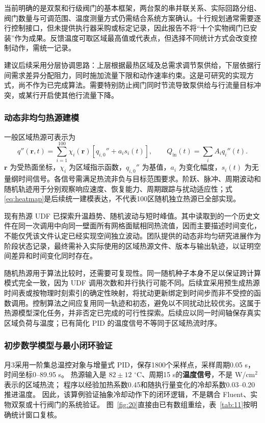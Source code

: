 \documentclass[stage2,UTF8,fontset=fandol]{ydzjreport}
\begin{document}
当前明确的是双泵和行级阀门的基本框架，两台泵的串并联关系、实际回路分组、阀门数量与可调范围、温度测量方式仍需结合系统方案确认。十行规划通常需要逐行控制接口，但未提供执行器采购或标定记录，因此报告不将“十个实物阀门已安装”作为成果。反馈温度可取区域最高值或代表点，但选择不同统计方式会改变控制动作，需统一记录。

建议后续采用分层协调思路：上层根据最热区域及总需求调节泵供给，下层依据行间需求差异分配阻力，同时施加流量下限和动作速率约束。这是可研究的实现方式，尚不作为已完成算法。需要特别防止阀门同时节流导致泵供给与行流量目标冲突，或某行开启使其他行流量下降。

\subsubsection{动态非均匀热源建模}
一般区域热源可表示为
\begin{equation}
q''(\bm r,t)=\sum_{i=1}^{100}\chi_i(\bm r)\left[q_{i,0}''+a_i s_i(t)\right],\qquad
Q_{\mathrm{in}}(t)=\sum_i A_i q_i''(t).\label{eq:heatmap}
\end{equation}
$\bm r$ 为受热面坐标，$\chi_i$ 为区域指示函数，$q_{i,0}''$ 为基值，$a_i$ 为变化幅度，$s_i(t)$ 为无量纲时间信号。各信号需满足热流非负与目标范围要求。阶跃、脉冲、周期波动和随机轨迹用于分别观察响应速度、恢复能力、周期跟踪与扰动适应性；式\eqref{eq:heatmap}是后续统一建模表达，不代表100区随机独立热源已全部实现。

现有热源 UDF 已探索升温趋势、随机波动与短时峰值。其中读取到的一个历史文件在同一次调用中向同一壁面所有网格面赋相同热流值，因而主要描述时间变化，不能仅凭该文件认定已经实现空间独立波动。团队提供的动态非均匀研究进展作为阶段状态记录，最终需补入实际使用的区域热源文件、版本与输出轨迹，以证明空间差异和时间变化同时存在。

随机热源用于算法比较时，还需要可复现性。同一随机种子本身不足以保证跨计算模式完全一致，因为 UDF 调用次数和并行执行可能不同。后续宜采用预生成热源时间表或按物理时刻索引的确定性映射，将扰动更新绑定到时间步而非不受控的函数调用。控制算法之间应复用同一轨迹和初态，避免以不同扰动比较优劣。这属于热源模型深化任务，并非否定已完成的可行性探索。后续应以同一时间轴保存真实区域负荷与温度；已有简化 PID 的温度信号不等同于区域热流时序。


\subsubsection{初步数学模型与最小闭环验证}

月3采用一阶集总温控对象与增量式 PID，保存1800个采样点，采样周期0.05 s，时间坐标0--89.95 s。
热源输入是 $82\pm12$ $^\circ$C、周期15 s的\textbf{温度信号}，不是 W/cm$^2$ 表示的区域热流；
程序以经验加热系数0.45和随执行量变化的冷却系数0.03--0.20推进温度。
因此，该算例验证抽象冷却动作下的闭环逻辑，不是耦合 Fluent、实物双泵或十行阀门的系统验证。
图~\ref{fig:20}直接由已有数组重绘，表~\ref{tab:11}按明确统计窗口复核\cite{monthly3}。
\end{document}
